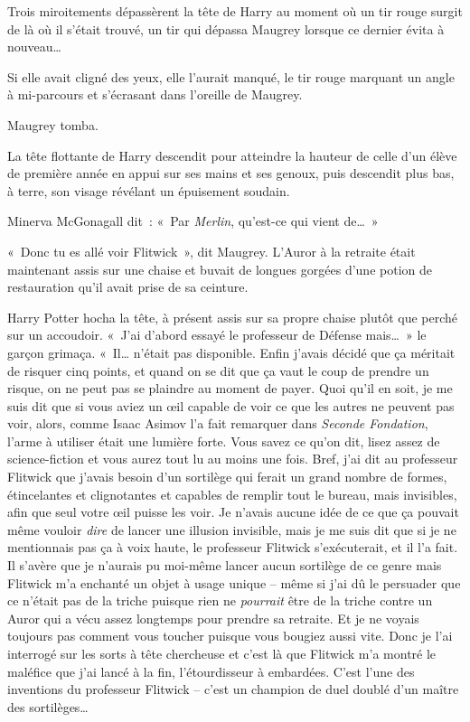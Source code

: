 Trois miroitements dépassèrent la tête de Harry au moment où un tir rouge surgit de là où il s'était trouvé, un tir qui dépassa Maugrey lorsque ce dernier évita à nouveau…

Si elle avait cligné des yeux, elle l'aurait manqué, le tir rouge marquant un angle à mi-parcours et s'écrasant dans l'oreille de Maugrey.

Maugrey tomba.

La tête flottante de Harry descendit pour atteindre la hauteur de celle d'un élève de première année en appui sur ses mains et ses genoux, puis descendit plus bas, à terre, son visage révélant un épuisement soudain.

Minerva McGonagall dit~: «~Par \emph{Merlin}, qu'est-ce qui vient de…~»

\later

«~Donc tu es allé voir Flitwick~», dit Maugrey.
L'Auror à la retraite était maintenant assis sur une chaise et buvait de longues gorgées d'une potion de restauration qu'il avait prise de sa ceinture.

Harry Potter hocha la tête, à présent assis sur sa propre chaise plutôt que perché sur un accoudoir.
«~J'ai d'abord essayé le professeur de Défense mais…~»
le garçon grimaça.
«~Il… n'était pas disponible.
Enfin j'avais décidé que ça méritait de risquer cinq points, et quand on se dit que ça vaut le coup de prendre un risque, on ne peut pas se plaindre au moment de payer.
Quoi qu'il en soit, je me suis dit que si vous aviez un œil capable de voir ce que les autres ne peuvent pas voir, alors, comme Isaac Asimov l'a fait remarquer dans \emph{Seconde Fondation}, l'arme à utiliser était une lumière forte.
Vous savez ce qu'on dit, lisez assez de science-fiction et vous aurez tout lu au moins une fois.
Bref, j'ai dit au professeur Flitwick que j'avais besoin d'un sortilège qui ferait un grand nombre de formes, étincelantes et clignotantes et capables de remplir tout le bureau, mais invisibles, afin que seul votre œil puisse les voir.
Je n'avais aucune idée de ce que ça pouvait même vouloir \emph{dire} de lancer une illusion invisible, mais je me suis dit que si je ne mentionnais pas ça à voix haute, le professeur Flitwick s'exécuterait, et il l'a fait.
Il s'avère que je n'aurais pu moi-même lancer aucun sortilège de ce genre mais Flitwick m'a enchanté un objet à usage unique -- même si j'ai dû le persuader que ce n'était pas de la triche puisque rien ne \emph{pourrait} être de la triche contre un Auror qui a vécu assez longtemps pour prendre sa retraite.
Et je ne voyais toujours pas comment vous toucher puisque vous bougiez aussi vite.
Donc je l'ai interrogé sur les sorts à tête chercheuse et c'est là que Flitwick m'a montré le maléfice que j'ai lancé à la fin, l'étourdisseur à embardées.
C'est l'une des inventions du professeur Flitwick -- c'est un champion de duel doublé d'un maître des sortilèges…

